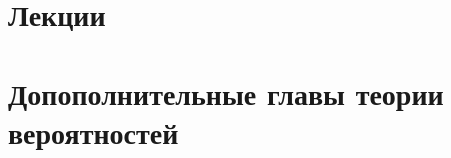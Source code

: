 \documentclass[a4paper,12pt]{book}
\begin{document}
    \pagestyle{empty}
    \titlepage
    \tableofcontents

    \chapter{Лекции}
    \pagestyle{fancy}
    
    
    
    
    
    
    
    
    
    
    
    
    
    
    
    
    

    \setcounter{theorem}{0}
    \setcounter{definition}{0}
    \pagestyle{empty}
    \chapter{Допополнительные главы теории вероятностей}
    \pagestyle{fancy}
    
    
    
\end{document}
